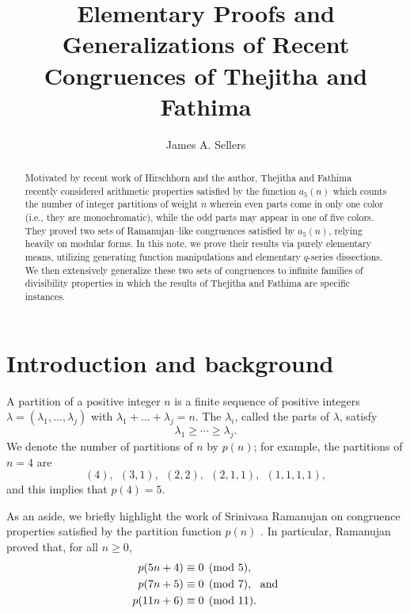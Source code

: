 \documentclass[10pt, reqno]{amsart}
\title[]{Elementary Proofs and Generalizations of Recent Congruences of Thejitha and Fathima}%
\author{James A. Sellers}
\date{}
\theoremstyle{theorem}
\theoremstyle{definition}
\theoremstyle{example}
\begin{document}

\maketitle

\begin{abstract}
Motivated by recent work of Hirschhorn and the author, Thejitha and Fathima recently considered arithmetic properties satisfied by the function $a_5(n)$ which counts the number of integer partitions of weight $n$ wherein even parts come in only one color (i.e., they are monochromatic), while the odd parts may appear in one of five colors.  They proved two sets of Ramanujan--like congruences satisfied by $a_5(n)$, relying heavily on modular forms.  In this note, we prove their results via purely elementary means, utilizing generating function manipulations and elementary $q$-series dissections.  We then extensively generalize these two sets of congruences to infinite families of divisibility properties in which the results of Thejitha and Fathima are specific instances.  
\end{abstract}

\section{Introduction and background}
\label{sec:intro}
A partition of a positive integer $n$ is a finite sequence of positive integers $\lambda = (\lambda_1, \ldots, \lambda_j)$ with $\lambda_1 + \dots + \lambda_j = n$.
The $\lambda_i$, called the parts of $\lambda$, satisfy
\begin{equation*}
\lambda_1 \ge \cdots \ge \lambda_j.
\end{equation*}  
We denote the number of partitions of $n$ by $p(n)$; for example, the partitions of $n=4$ are 
$$(4), \ \ (3,1), \ \ (2,2), \ \ (2,1,1), \ \ (1,1,1,1),$$
and this implies that $p(4) = 5$.  

As an aside, we briefly highlight the work of Srinivasa Ramanujan on congruence properties satisfied by the partition function $p(n)$ \cite{Ram1919}.  In particular, Ramanujan proved that, for all $n\geq 0$, 
\begin{align}
p(5n+4) &\equiv 0 \pmod{5}, \label{RamCongMod5} \\
p(7n+5) &\equiv 0 \pmod{7}, \text{\ \ and} \notag \\
p(11n+6) &\equiv 0 \pmod{11}.  \notag
\end{align}
\end{document}
